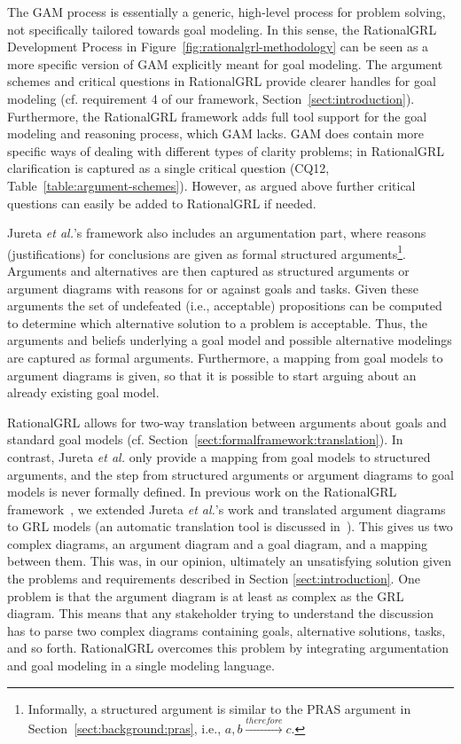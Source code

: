 The GAM process is essentially a generic, high-level process for problem solving, not specifically tailored towards goal modeling. In this sense, the RationalGRL Development Process in Figure~\ref{fig:rationalgrl-methodology} can be seen as a more specific version of GAM explicitly meant for goal modeling. The argument schemes and critical questions in RationalGRL provide clearer handles for goal modeling (cf. requirement 4 of our framework, Section~\ref{sect:introduction}). Furthermore, the RationalGRL framework adds full tool support for the goal modeling and reasoning process, which GAM lacks. GAM does contain more specific ways of dealing with different types of clarity problems; in RationalGRL clarification is captured as a single critical question (CQ12, Table~\ref{table:argument-schemes}). However, as argued above further critical questions can easily be added to RationalGRL if needed.

Jureta \emph{et al.}'s framework also includes an argumentation part, where reasons (justifications) for conclusions are given as formal structured arguments\footnote{Informally, a structured argument is similar to the PRAS argument in Section~\ref{sect:background:pras}, i.e., $a, b \xrightarrow{therefore} c$.}. Arguments and alternatives are then captured as structured arguments or argument diagrams with reasons for or against goals and tasks. Given these arguments the set of undefeated (i.e., acceptable) propositions can be computed to determine which alternative solution to a problem is acceptable. Thus, the arguments and beliefs underlying a goal model and possible alternative modelings are captured as formal arguments. Furthermore, a mapping from goal models to argument diagrams is given, so that it is possible to start arguing about an already existing goal model.

RationalGRL allows for two-way translation between arguments about goals and standard goal models (cf. Section~\ref{sect:formalframework:translation}). In contrast, Jureta \emph{et al.} only provide a mapping from goal models to structured arguments, and the step from structured arguments or argument diagrams to goal models is never formally defined. In previous work on the RationalGRL framework~\cite{vanzee-etal:renext2015,vanZee-etal:er2016}, we extended Jureta \emph{et al.}'s work and translated argument diagrams to GRL models (an automatic translation tool is discussed in~\cite{vanZee-etal:er2016}). This gives us two complex diagrams, an argument diagram and a goal diagram, and a mapping between them. This was, in our opinion, ultimately an unsatisfying solution given the problems and requirements described in Section \ref{sect:introduction}. One problem is that the argument diagram is at least as complex as the GRL diagram. This means that any stakeholder trying to understand the discussion has to parse two complex diagrams containing goals, alternative solutions, tasks, and so forth. RationalGRL overcomes this problem by integrating argumentation and goal modeling in a single modeling language.

